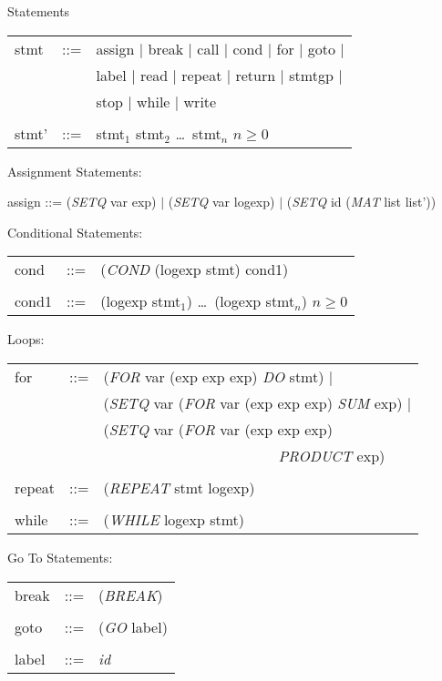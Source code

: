 \begin{describe}{Statements}
\begin{tabular}{lll}
stmt & ::= &  assign  $\mid$  break  $\mid$  call  $\mid$  cond  $\mid$
for  $\mid$  goto $\mid$\\
& & label  $\mid$  read  $\mid$  repeat  $\mid$  return  $\mid$  stmtgp
$\mid$\\
& & stop  $\mid$  while  $\mid$  write \\
& &\\
stmt' &  ::= & stmt$_1$ stmt$_2$ \dots\  stmt$_n$   $n \geq 0$\\
\end{tabular}

Assignment Statements:

assign  ::=  ({\it SETQ\/} var exp)  $\mid$  ({\it SETQ\/} var logexp) $\mid$
             ({\it SETQ\/} id ({\it MAT\/} list list'))

Conditional Statements:

\begin{tabular}{lll}
cond & ::= & ({\it COND\/} (logexp stmt) cond1) \\
& & \\
cond1 & ::= & (logexp stmt$_1$) \dots\  (logexp stmt$_n$) $n \geq 0$\\
\end{tabular}

Loops:

\begin{tabular}{lll}
for & ::= & ({\it FOR\/} var (exp exp exp) {\it DO\/} stmt) $\mid$\\
& &  ({\it SETQ\/} var ({\it FOR\/} var (exp exp exp) {\it SUM\/} exp) $\mid$\\
& & ({\it SETQ\/} var ({\it FOR\/} var (exp exp exp) \\
& & \ \ \ \ \ \ \ \ \ \ \ \ \ \ \ \ \ \ \ \ \ \ \ \ {\it PRODUCT\/} exp)\\
& &\\
repeat & ::= & ({\it REPEAT\/} stmt logexp)\\
& &\\
while & ::= & ({\it WHILE\/} logexp stmt)
\end{tabular}

Go To Statements:

\begin{tabular}{lll} 
break & ::= & ({\it BREAK\/})\\
& & \\
goto & ::= & ({\it GO\/} label)\\
& & \\
label & ::= & {\it id}\\
\end{tabular}


\end{describe}
